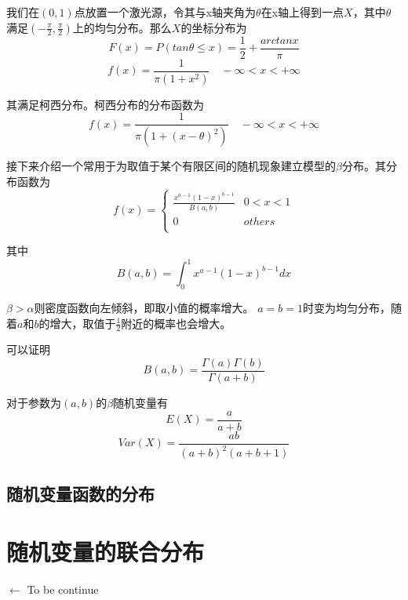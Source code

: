 \documentclass[UTF8]{ctexart}
\begin{document}
我们在$(0,1)$点放置一个激光源，令其与x轴夹角为$\theta $在x轴上得到一点$X$，其中$\theta $满足$(-\frac{\pi }{2},\frac{\pi }{2})$上的均匀分布。那么$X$的坐标分布为
$$F(x)=P(tan\theta \leq x)=\frac{1}{2}+\frac{arctanx}{\pi } $$
$$f(x)=\frac{1}{\pi (1+x^{2})}\quad -\infty <x<+\infty $$

其满足柯西分布。柯西分布的分布函数为
$$f(x)=\frac{1}{\pi (1+(x-\theta )^{2})}\quad -\infty <x<+\infty $$

接下来介绍一个常用于为取值于某个有限区间的随机现象建立模型的$\beta $分布。其分布函数为
$$f(x)=\left\{
\begin{array}{ll}
\displaystyle\frac{x^{a-1}(1-x)^{b-1}}{B(a,b)} &0<x<1\\
0 &others\\
\end{array}
\right. $$

其中
$$B(a,b)=\int_{0}^{1}x^{a-1}(1-x)^{b-1}dx $$

$\beta >\alpha $则密度函数向左倾斜，即取小值的概率增大。
$a=b=1$时变为均匀分布，随着$a$和$b$的增大，取值于$\frac{1}{2}$附近的概率也会增大。

可以证明
$$B(a,b)=\frac{\Gamma (a)\Gamma (b)}{\Gamma (a+b)} $$

对于参数为$(a,b)$的$\beta $随机变量有
$$E(X)=\frac{a}{a+b} $$
$$Var(X)=\frac{ab}{(a+b)^{2}(a+b+1)} $$

\subsection{随机变量函数的分布}

\section{随机变量的联合分布}



$\gets$ To be continue
\end{document}
